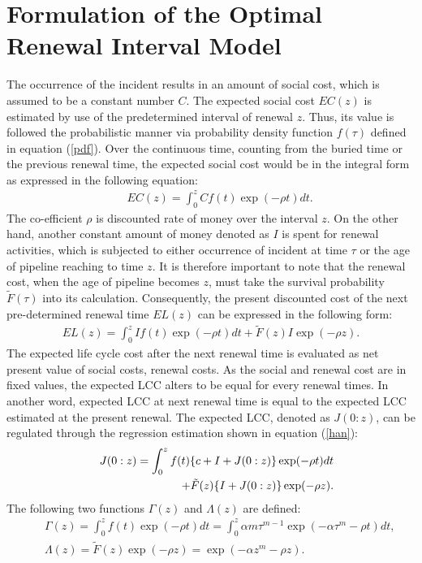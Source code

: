 \section{Formulation of the Optimal Renewal Interval Model}
\label{56}
The occurrence of the incident results in an amount of social cost, which is assumed to be a constant number $C$. The expected social cost $EC(z)$ is estimated by use of the predetermined interval of renewal $z$. Thus, its value is followed the probabilistic manner via probability density function $f(\tau)$ defined in equation (\ref{pdf}). Over the continuous time, counting from the buried time or the previous renewal time, the expected social cost would be in the integral form as expressed in the following equation:
\begin{eqnarray}
&& EC(z)=\int_0^{z} C f(t)\exp(-\rho t)dt. \label{socialcost}
\end{eqnarray}
The co-efficient $\rho$ is discounted rate of money over the interval $z$. On the other hand, another constant amount of money denoted as $I$ is spent for renewal activities, which is subjected to either occurrence of incident at time $\tau$ or the age of pipeline reaching to time $z$. It is therefore important to note that the renewal cost, when the age of pipeline becomes $z$, must take the survival probability $\tilde{F}(\tau)$ into its calculation. Consequently, the present discounted cost of the next pre-determined renewal time $EL(z)$ can be expressed in the following form:
\begin{eqnarray}
EL(z)=\int_0^{z} I f(t)\exp(-\rho t)dt +  \tilde{F}(z)I \exp(-\rho z). \label{totalcost}
\end{eqnarray}
The expected life cycle cost after the next renewal time is evaluated as net present value of social costs, renewal costs. As the social and renewal cost are in fixed values, the expected LCC alters to be equal for every renewal times. In another word, expected LCC at next renewal time is equal to the expected LCC estimated at the present renewal. The expected LCC, denoted as $J(0:z)$, can be regulated through the regression estimation shown in equation (\ref{han}):
\begin{eqnarray}
&& J(0:z)= \int_0^{z} f(t)\{c+I+J(0:z)\} \exp(-\rho t)dt  \nonumber \\
&& \hspace{10mm} + \tilde{F}(z)\{I+J(0:z)\} \exp(-\rho z).  \label{han}
\end{eqnarray}
The following two functions $\Gamma(z)$ and $\Lambda(z)$ are defined:
\begin{eqnarray}
&& \Gamma(z)=\int_0^{z} f(t)\exp(-\rho t)dt 
 = \int_0^z  \alpha m\tau^{m-1}\exp(- \alpha \tau^m-\rho t)dt, \label{gamma5}\\
&& \Lambda(z)= \tilde{F}(z) \exp(-\rho z)
  =\exp(- \alpha z^m-\rho z) . \label{alpha}
\end{eqnarray}
